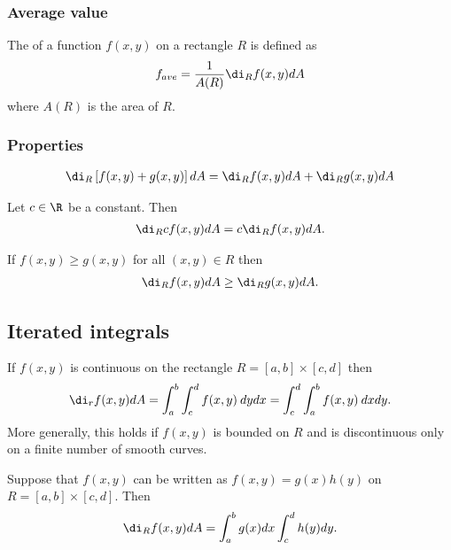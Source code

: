 \documentclass{article}
\begin{document}
\subsubsection{Average value}


\begin{definition}
    The  of a function $f(x,y)$ on a rectangle $R$
    is defined as
    \begin{align*}
        f_{ave} = \frac{1}{A(R)}\di_R f(x,y)dA
    \end{align*}
    where $A(R)$ is the area of $R$.
\end{definition}


\subsubsection{Properties}


\begin{theorem}
    \begin{align*}
        \di_R\left[f(x,y)+g(x,y)\right]dA = \di_R f(x,y)dA + \di_R g(x,y)dA
    \end{align*}
\end{theorem}
\begin{theorem}
    Let $c\in\R$ be a constant. Then
    \begin{align*}
        \di_R cf(x,y)dA = c\di_R f(x,y)dA.
    \end{align*} 
\end{theorem}
\begin{theorem}
    If $f(x,y)\geq g(x,y)$ for all $(x,y)\in R$ then 
    \begin{align*}
        \di_R f(x,y)dA \geq \di_R g(x,y) dA.
    \end{align*}
\end{theorem}

\subsection{Iterated integrals}

\begin{theorem}
    If $f(x,y)$ is continuous on the rectangle $R=[a,b]\times[c,d]$ then 
    \begin{align*}
        \di_r f(x,y)dA = \int_a^b \int_c^d f(x,y)\:dydx 
        = \int_c^d \int_a^b f(x,y)\:dxdy.
    \end{align*}
    More generally, this holds if $f(x,y)$ is bounded on $R$ and is
    discontinuous only on a finite number of smooth curves.
\end{theorem}
\begin{lemma}
    Suppose that $f(x,y)$ can be written as $f(x,y)=g(x)h(y)$ 
    on $R=[a,b]\times[c,d]$. Then
    \begin{align*}
        \di_R f(x,y)dA = \int_a^b g(x)dx \int_c^d h(y)dy.
    \end{align*}
\end{lemma}
\end{document}
